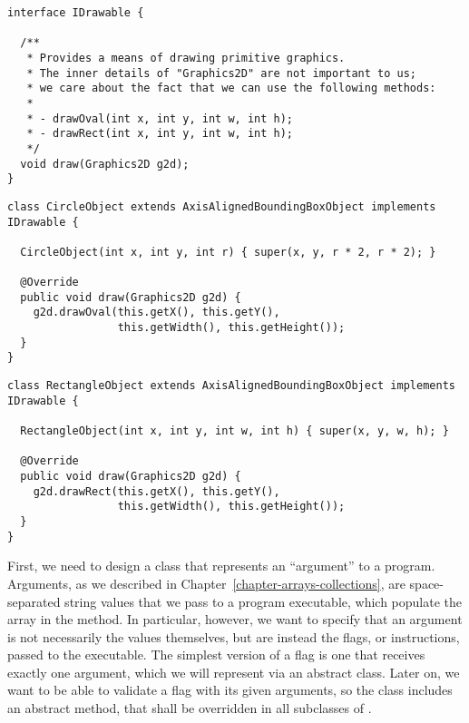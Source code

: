 \enlargethispage{-4\baselineskip}
\begin{lstlisting}[language=MyJava]
interface IDrawable {
  
  /**
   * Provides a means of drawing primitive graphics.
   * The inner details of "Graphics2D" are not important to us; 
   * we care about the fact that we can use the following methods:
   * 
   * - drawOval(int x, int y, int w, int h);
   * - drawRect(int x, int y, int w, int h);
   */
  void draw(Graphics2D g2d); 
}
\end{lstlisting} 

\begin{lstlisting}[language=MyJava]
class CircleObject extends AxisAlignedBoundingBoxObject implements IDrawable {
  
  CircleObject(int x, int y, int r) { super(x, y, r * 2, r * 2); }

  @Override
  public void draw(Graphics2D g2d) {
    g2d.drawOval(this.getX(), this.getY(), 
                 this.getWidth(), this.getHeight());
  }
}
\end{lstlisting}

\begin{lstlisting}[language=MyJava]
class RectangleObject extends AxisAlignedBoundingBoxObject implements IDrawable {
  
  RectangleObject(int x, int y, int w, int h) { super(x, y, w, h); }
  
  @Override
  public void draw(Graphics2D g2d) {
    g2d.drawRect(this.getX(), this.getY(), 
                 this.getWidth(), this.getHeight());
  }
}
\end{lstlisting}


First, we need to design a class that represents an ``argument'' to a program. Arguments, as we described in Chapter~\ref{chapter-arrays-collections}, are space-separated string values that we pass to a program executable, which populate the  array in the  method. In particular, however, we want to specify that an argument is not necessarily the values themselves, but are instead the flags, or instructions, passed to the executable. The simplest version of a flag is one that receives exactly one argument, which we will represent via an abstract  class. Later on, we want to be able to validate a flag with its given arguments, so the  class includes an abstract  method, that shall be overridden in all subclasses of .

